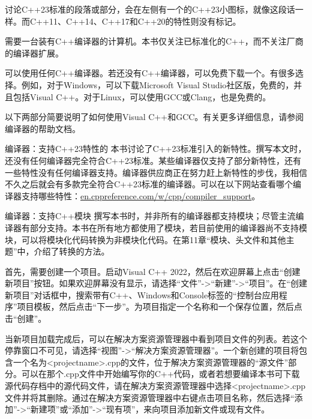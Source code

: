 

讨论C++23标准的段落或部分，会在左侧有一个的C++23小图标，就像这段话一样。而C++11、C++14、C++17和C++20的特性则没有标记。


需要一台装有C++编译器的计算机。本书仅关注已标准化的C++，而不关注厂商的编译器扩展。


可以使用任何C++编译器。若还没有C++编译器，可以免费下载一个。有很多选择。例如，对于Windows，可以下载Microsoft Visual Studio社区版，免费的，并且包括Visual C++。对于Linux，可以使用GCC或Clang，也是免费的。

以下两部分简要说明了如何使用Visual C++和GCC。有关更多详细信息，请参阅编译器的帮助文档。

\begin{myTip}{编译器：支持C++23特性的}
本书讨论了C++23标准引入的新特性。撰写本文时，还没有任何编译器完全符合C++23标准。某些编译器仅支持了部分新特性，还有一些特性没有任何编译器支持。编译器供应商正在努力赶上新特性的步伐，我相信不久之后就会有多款完全符合C++23标准的编译器。可以在以下网站查看哪个编译器支持哪些特性：\url{en.cppreference.com/w/cpp/compiler_support}。
\end{myTip}

\begin{myTip}{编译器：支持C++模块}
撰写本书时，并非所有的编译器都支持模块；尽管主流编译器有部分支持。本书在所有地方都使用了模块，若目前使用的编译器尚不支持模块，可以将模块化代码转换为非模块化代码。在第11章“模块、头文件和其他主题”中，介绍了转换的方法。
\end{myTip}


首先，需要创建一个项目。启动Visual C++ 2022，然后在欢迎屏幕上点击“创建新项目”按钮。如果欢迎屏幕没有显示，请选择“文件”->“新建”->“项目”。在“创建新项目”对话框中，搜索带有C++、Windows和Console标签的“控制台应用程序”项目模板，然后点击“下一步”。为项目指定一个名称和一个保存位置，然后点击“创建”。

当新项目加载完成后，可以在解决方案资源管理器中看到项目文件的列表。若这个停靠窗口不可见，请选择“视图”->“解决方案资源管理器”。一个新创建的项目将包含一个名为<projectname>.cpp的文件，位于解决方案资源管理器的“源文件”部分。可以在那个.cpp文件中开始编写你的C++代码，或者若想要编译本书可下载源代码存档中的源代码文件，请在解决方案资源管理器中选择<projectname>.cpp文件并将其删除。通过在解决方案资源管理器中右键点击项目名称，然后选择“添加”->“新建项”或“添加”->“现有项”，来向项目添加新文件或现有文件。

